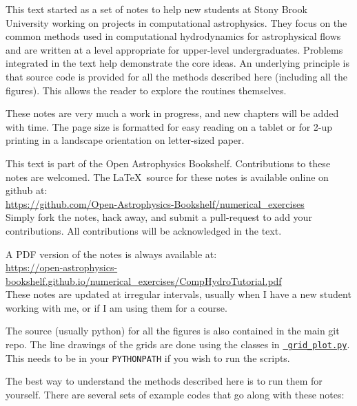 
This text started as a set of notes to help new students at Stony
Brook University working on projects in computational astrophysics.
They focus on the common methods used in computational hydrodynamics
for astrophysical flows and are written at a level appropriate for
upper-level undergraduates.  Problems integrated in the text help
demonstrate the core ideas.  An underlying principle is that source
code is provided for all the methods described here (including all the
figures).  This allows the reader to explore the routines themselves.

These notes are very much a work in progress, and new chapters will be
added with time.  The page size is formatted for easy reading
on a tablet or for 2-up printing in a landscape orientation on
letter-sized paper.

This text is part of the Open Astrophysics Bookshelf.
Contributions to these notes are welcomed.  The \LaTeX\ source
for these notes is available online on github at: \\[0.25em]
%
\url{https://github.com/Open-Astrophysics-Bookshelf/numerical_exercises} \\[0.25em]
%
Simply fork the notes, hack away, and submit a pull-request to add
your contributions.  All contributions will be acknowledged in the text.


A PDF version of the notes is always available
at: \\[0.25em]
%
\url{https://open-astrophysics-bookshelf.github.io/numerical_exercises/CompHydroTutorial.pdf} \\[0.25em]
%
These notes are updated at irregular intervals, usually when I have a
new student working with me, or if I am using them for a course.

The source (usually python) for all the figures is also contained in
the main git repo.  The line drawings of the grids are done using the
classes in
\href{https://github.com/Open-Astrophysics-Bookshelf/numerical_exercises/blob/master/grid_plot.py}{{\tt
    grid\_plot.py}}.  This needs to be in your {\tt PYTHONPATH} if you
wish to run the scripts.

The best way to understand the methods described here is to run
them for yourself.  There are several sets of example codes that
go along with these notes:

